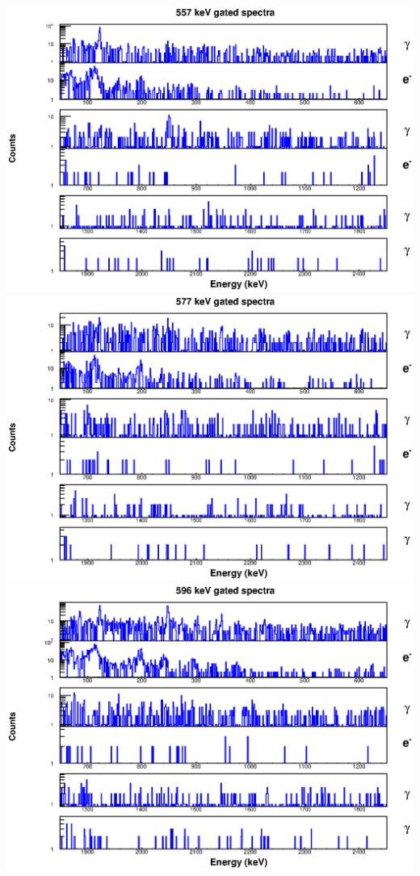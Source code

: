 \begin{landscape}
\includegraphics[scale=1.1]{154Gd_Appendix/557_combined.eps}
\includegraphics[scale=1.1]{154Gd_Appendix/577_combined.eps}
\includegraphics[scale=1.1]{154Gd_Appendix/596_combined.eps}

\end{landscape}
